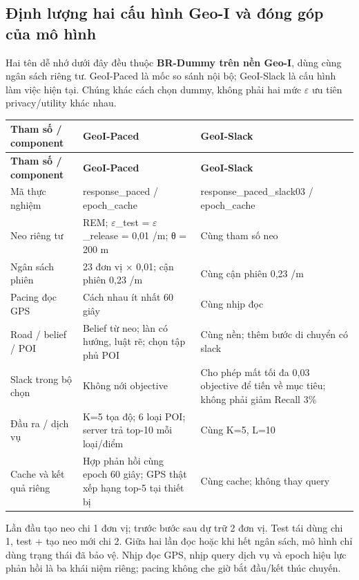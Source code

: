 \subsection{Định lượng hai cấu hình Geo-I và đóng góp của mô hình}
Hai tên dễ nhớ dưới đây đều thuộc \textbf{BR-Dummy trên nền Geo-I}, dùng cùng ngân sách riêng tư. GeoI-Paced là mốc so sánh nội bộ; GeoI-Slack là cấu hình làm việc hiện tại. Chúng khác cách chọn dummy, không phải hai mức $\varepsilon$ ưu tiên privacy/utility khác nhau.

\begingroup\small
\begin{longtable}{@{}P{3.938cm}P{6.350cm}P{6.350cm}@{}}
\toprule
\textbf{Tham số / component} & \textbf{GeoI-Paced} & \textbf{GeoI-Slack}\\\midrule
\endfirsthead
\toprule
\textbf{Tham số / component} & \textbf{GeoI-Paced} & \textbf{GeoI-Slack}\\\midrule
\endhead
\bottomrule\endfoot
Mã thực nghiệm & response\_\allowbreak{}paced / epoch\_\allowbreak{}cache & response\_\allowbreak{}paced\_\allowbreak{}slack03 / epoch\_\allowbreak{}cache\\
\addlinespace[3pt]
Neo riêng tư & REM; $\varepsilon$\_\allowbreak{}test = $\varepsilon$\_\allowbreak{}release = 0,01 /m; θ = 200 m & Cùng tham số neo\\
\addlinespace[3pt]
Ngân sách phiên & 23 đơn vị $\times$ 0,01; cận phiên 0,23 /m & Cùng cận phiên 0,23 /m\\
\addlinespace[3pt]
Pacing đọc GPS & Cách nhau ít nhất 60 giây & Cùng nhịp đọc\\
\addlinespace[3pt]
Road / belief / POI & Belief từ neo; làn có hướng, luật rẽ; chọn tập phủ POI & Cùng nền; thêm bước di chuyển có slack\\
\addlinespace[3pt]
Slack trong bộ chọn & Không nới objective & Cho phép mất tối đa 0,03 objective để tiến về mục tiêu; không phải giảm Recall 3\%\\
\addlinespace[3pt]
Đầu ra / dịch vụ & K=5 tọa độ; 6 loại POI; server trả top-10 mỗi loại/điểm & Cùng K=5, L=10\\
\addlinespace[3pt]
Cache và kết quả riêng & Hợp phản hồi cùng epoch 60 giây; GPS thật xếp hạng top-5 tại thiết bị & Cùng cache; không thay query\\
\end{longtable}
\endgroup
Lần đầu tạo neo chi 1 đơn vị; trước bước sau dự trữ 2 đơn vị. Test tái dùng chi 1, test + tạo neo mới chi 2. Giữa hai lần đọc hoặc khi hết ngân sách, mô hình chỉ dùng trạng thái đã bảo vệ. Nhịp đọc GPS, nhịp query dịch vụ và epoch hiệu lực phản hồi là ba khái niệm riêng; pacing không che giờ bắt đầu/kết thúc chuyến.

